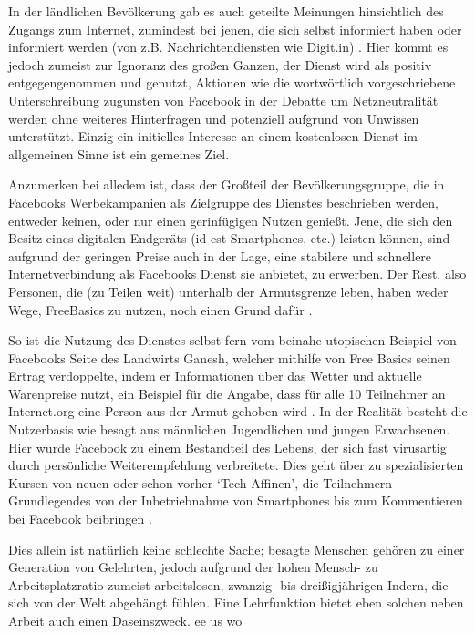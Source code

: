 \documentclass{article}
\begin{document}
In der ländlichen Bevölkerung gab es auch geteilte Meinungen hinsichtlich des Zugangs zum Internet, zumindest bei jenen, die sich selbst informiert haben oder informiert werden (von z.B. Nachrichtendiensten wie Digit.in) \parencite{digitYT}.
Hier kommt es jedoch zumeist zur Ignoranz des großen Ganzen, der Dienst wird als positiv entgegengenommen und genutzt, Aktionen wie die wortwörtlich vorgeschriebene Unterschreibung zugunsten von Facebook in der Debatte um Netzneutralität\autocite{ndtvYT} werden ohne weiteres Hinterfragen und potenziell aufgrund von Unwissen unterstützt.
Einzig ein initielles Interesse an einem kostenlosen Dienst im allgemeinen Sinne ist ein gemeines Ziel.

\medskip

Anzumerken bei alledem ist, dass der Großteil der Bevölkerungsgruppe, die in Facebooks Werbekampanien als Zielgruppe des Dienstes beschrieben werden, entweder keinen, oder nur einen gerinfügigen Nutzen genießt.
Jene, die sich den Besitz eines digitalen Endgeräts (id est Smartphones, etc.) leisten können, sind aufgrund der geringen Preise auch in der Lage, eine stabilere und schnellere Internetverbindung als Facebooks Dienst sie anbietet, zu erwerben.
Der Rest, also Personen, die (zu Teilen weit) unterhalb der Armutsgrenze leben, haben weder Wege, FreeBasics zu nutzen, noch einen Grund dafür \parencite[257]{everydayLife}.

\medskip

So ist die Nutzung des Dienstes selbst fern vom beinahe utopischen Beispiel von Facebooks Seite des Landwirts Ganesh, welcher mithilfe von Free Basics seinen Ertrag verdoppelte, indem er Informationen über das Wetter und aktuelle Warenpreise nutzt, ein Beispiel für die Angabe, dass für alle 10 Teilnehmer an Internet.org eine Person aus der Armut gehoben wird \parencite[4]{prasad2017}.
In der Realität besteht die Nutzerbasis wie besagt aus männlichen Jugendlichen und jungen Erwachsenen.
Hier wurde Facebook zu einem Bestandteil des Lebens, der sich fast virusartig durch persönliche Weiterempfehlung verbreitete.
Dies geht über zu spezialisierten Kursen von neuen oder schon vorher `Tech-Affinen', die Teilnehmern Grundlegendes von der Inbetriebnahme von Smartphones bis zum Kommentieren bei Facebook beibringen \parencite{empowermentThroughFacebook}.

\medskip

Dies allein ist natürlich keine schlechte Sache; besagte Menschen gehören zu einer Generation von Gelehrten, jedoch aufgrund der hohen Mensch- zu Arbeitsplatzratio zumeist arbeitslosen, zwanzig- bis dreißigjährigen Indern, die sich von der Welt abgehängt fühlen.
Eine Lehrfunktion bietet eben solchen neben Arbeit auch einen Daseinszweck.
ee us wo
\medskip
\end{document}
